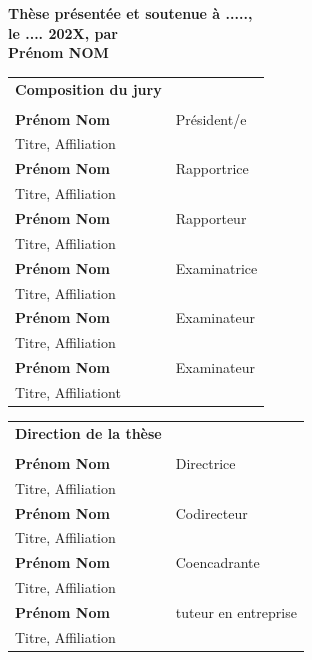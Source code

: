 \documentclass[french,12pt,a4paper]{book}
\begin{document}
\begin{titlepage}
\textbf{Thèse présentée et soutenue à .....,\\ le .... 202X, par}\\
\bigskip
\Large {\color{Prune} \textbf{Prénom NOM}}


\vspace{\fill} %

\bigskip

\flushleft

\scriptsize
\begin{tabular}{|p{7cm}l}
\arrayrulecolor{Prune}
{\footnotesize \textbf{Composition du jury}}\\
& \\
\textbf{Prénom Nom} &   Président/e\\ 
Titre, Affiliation & \\
\textbf{Prénom Nom} &  Rapportrice \\ 
Titre, Affiliation   &   \\ 
\textbf{Prénom Nom} &  Rapporteur \\ 
Titre, Affiliation  &   \\ 
\textbf{Prénom Nom} &  Examinatrice \\ 
Titre, Affiliation   &   \\ 
\textbf{Prénom Nom} &  Examinateur \\ 
Titre, Affiliation   &   \\ 
\textbf{Prénom Nom} &  Examinateur \\ 
Titre, Affiliationt   &   \\ 

\end{tabular} 

\medskip
\begin{tabular}{|p{7cm}l}
\arrayrulecolor{Prune}
{\footnotesize \textbf{Direction de la thèse}}\\
& \\
\textbf{Prénom Nom} &   Directrice\\ 
Titre, Affiliation & \\
\textbf{Prénom Nom} &   Codirecteur\\ 
Titre, Affiliation  &   \\ 
\textbf{Prénom Nom} &   Coencadrante\\ 
Titre, Affiliation  &   \\ 
\textbf{Prénom Nom} &  tuteur en entreprise \\ 
Titre, Affiliation  &   \\ 


\end{tabular} 


\end{titlepage}
\end{document}
